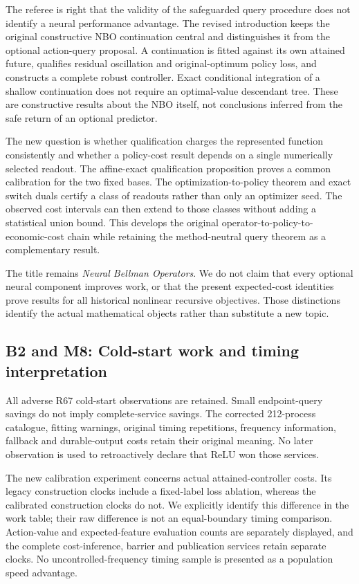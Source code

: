 The referee is right that the validity of the safeguarded query
procedure does not identify a neural performance advantage. The revised
introduction keeps the original constructive NBO continuation central
and distinguishes it from the optional action-query proposal. A
continuation is fitted against its own attained future, qualifies
residual oscillation and original-optimum policy loss, and constructs a
complete robust controller. Exact conditional integration of a shallow
continuation does not require an optimal-value descendant tree. These
are constructive results about the NBO itself, not conclusions inferred
from the safe return of an optional predictor.

The new question is whether qualification charges the represented
function consistently and whether a policy-cost result depends on a
single numerically selected readout. The affine-exact qualification
proposition proves a common calibration for the two fixed bases. The
optimization-to-policy theorem and exact switch duals certify a class of
readouts rather than only an optimizer seed. The observed cost intervals
can then extend to those classes without adding a statistical union
bound. This develops the original operator-to-policy-to-economic-cost
chain while retaining the method-neutral query theorem as a
complementary result.

The title remains \emph{Neural Bellman Operators}. We do not claim that
every optional neural component improves work, or that the present
expected-cost identities prove results for all historical nonlinear
recursive objectives. Those distinctions identify the actual
mathematical objects rather than substitute a new topic.

\hypertarget{b2-and-m8-cold-start-work-and-timing-interpretation}{%
\subsection{B2 and M8: Cold-start work and timing
interpretation}\label{b2-and-m8-cold-start-work-and-timing-interpretation}}

All adverse R67 cold-start observations are retained. Small
endpoint-query savings do not imply complete-service savings. The
corrected 212-process catalogue, fitting warnings, original timing
repetitions, frequency information, fallback and durable-output costs
retain their original meaning. No later observation is used to
retroactively declare that ReLU won those services.

The new calibration experiment concerns actual attained-controller
costs. Its legacy construction clocks include a fixed-label loss
ablation, whereas the calibrated construction clocks do not. We
explicitly identify this difference in the work table; their raw
difference is not an equal-boundary timing comparison. Action-value and
expected-feature evaluation counts are separately displayed, and the
complete cost-inference, barrier and publication services retain
separate clocks. No uncontrolled-frequency timing sample is presented as
a population speed advantage.

